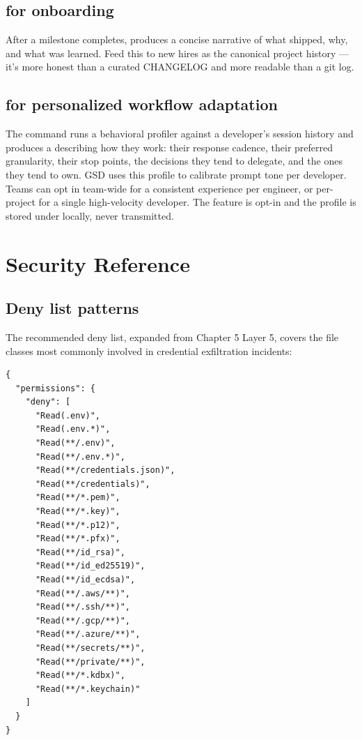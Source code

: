 \documentclass[11pt,letterpaper,openany]{book}
\begin{document}
\section{ for onboarding}

After a milestone completes,  produces a concise narrative of what shipped, why, and what was learned. Feed this to new hires as the canonical project history — it's more honest than a curated CHANGELOG and more readable than a git log.

\section{ for personalized workflow adaptation}

The  command runs a behavioral profiler against a developer's session history and produces a  describing how they work: their response cadence, their preferred granularity, their stop points, the decisions they tend to delegate, and the ones they tend to own. GSD uses this profile to calibrate prompt tone per developer. Teams can opt in team-wide for a consistent experience per engineer, or per-project for a single high-velocity developer. The feature is opt-in and the profile is stored under  locally, never transmitted.

\appendix

\chapter{Security Reference}

\section{Deny list patterns}

The recommended deny list, expanded from Chapter 5 Layer 5, covers the file classes most commonly involved in credential exfiltration incidents:

\begin{lstlisting}
{
  "permissions": {
    "deny": [
      "Read(.env)",
      "Read(.env.*)",
      "Read(**/.env)",
      "Read(**/.env.*)",
      "Read(**/credentials.json)",
      "Read(**/credentials)",
      "Read(**/*.pem)",
      "Read(**/*.key)",
      "Read(**/*.p12)",
      "Read(**/*.pfx)",
      "Read(**/id_rsa)",
      "Read(**/id_ed25519)",
      "Read(**/id_ecdsa)",
      "Read(**/.aws/**)",
      "Read(**/.ssh/**)",
      "Read(**/.gcp/**)",
      "Read(**/.azure/**)",
      "Read(**/secrets/**)",
      "Read(**/private/**)",
      "Read(**/*.kdbx)",
      "Read(**/*.keychain)"
    ]
  }
}
\end{lstlisting}
\end{document}
